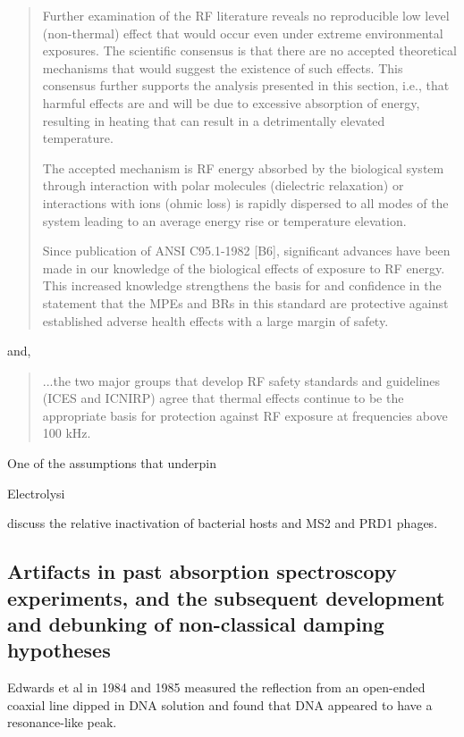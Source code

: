 \documentclass[paper.tex]{subfiles}
\begin{document}
\begin{quote}
	Further examination of the RF literature reveals no reproducible low level (non-thermal) effect that would
	occur even under extreme environmental exposures. The scientific consensus is that there are no accepted
	theoretical mechanisms that would suggest the existence of such effects. This consensus further supports the
	analysis presented in this section, i.e., that harmful effects are and will be due to excessive absorption of
	energy, resulting in heating that can result in a detrimentally elevated temperature. 
	
	The accepted mechanism is RF energy absorbed by the biological system through interaction with polar molecules (dielectric relaxation) or interactions with ions (ohmic loss) is rapidly dispersed to all modes of the system leading to an average energy rise or temperature elevation. 
	
	Since publication of ANSI C95.1-1982 [B6], significant advances have been made in our knowledge of the biological effects of exposure to RF energy. This increased knowledge strengthens the basis for and confidence in the statement that the MPEs and BRs in this	standard are protective against established adverse health effects with a large margin of safety.
\end{quote}

and, 

\begin{quote}
	...the two major groups that develop RF safety standards and
	guidelines (ICES and ICNIRP) agree that thermal effects continue to be the appropriate basis for protection
	against RF exposure at frequencies above 100 kHz.
\end{quote}



One of the assumptions that underpin 



Electrolysi

\cite{comparative2003} discuss the relative inactivation of bacterial hosts and MS2 and PRD1 phages. 

\subsection{Artifacts in past absorption spectroscopy experiments, and the subsequent development and debunking of non-classical damping hypotheses}

Edwards et al in 1984 and 1985 measured the reflection from an open-ended coaxial line dipped in DNA solution and found that DNA appeared to have a resonance-like peak.
\end{document}
